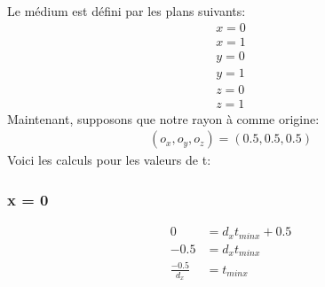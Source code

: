 \documentclass{article}
\begin{document}
Le médium est défini par les plans suivants:
\begin{align*}
    x = 0 \\
    x = 1 \\
    y = 0 \\
    y = 1 \\
    z = 0 \\
    z = 1
\end{align*}
Maintenant, supposons que notre rayon à comme origine:
\begin{align*}
    (o_x, o_y, o_z) = (0.5, 0.5, 0.5)
\end{align*}
Voici les calculs pour les valeurs de t: \\
\noindent\makebox[\linewidth]{\rule{\textwidth}{0.4pt}}
\subsubsection*{x = 0}
\begin{align*}
    0 &= d_xt_{minx} + 0.5 \\
    -0.5 &= d_xt_{minx} \\
    \frac{-0.5}{d_x} &= t_{minx}
\end{align*}
\noindent\makebox[\linewidth]{\rule{\textwidth}{0.4pt}}
\end{document}
